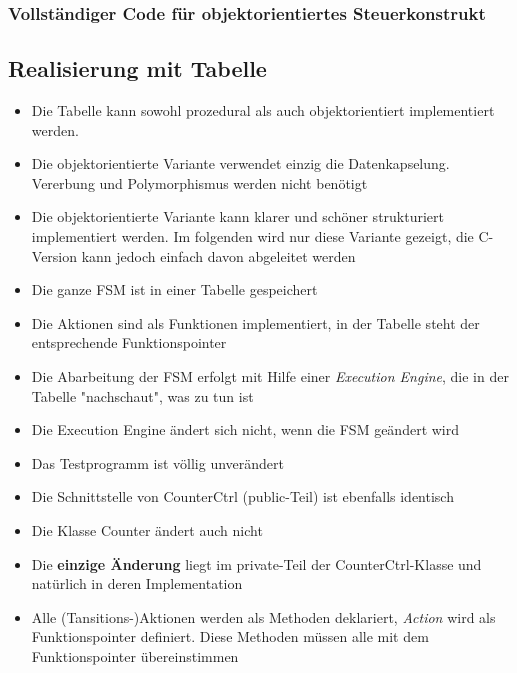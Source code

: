 \subsubsection{Vollständiger Code für objektorientiertes Steuerkonstrukt}



\subsection{Realisierung mit Tabelle}
\begin{itemize}
      \item Die Tabelle kann sowohl prozedural als auch objektorientiert implementiert werden.
      \item Die objektorientierte Variante verwendet einzig die Datenkapselung. Vererbung und Polymorphismus werden nicht benötigt
      \item Die objektorientierte Variante kann klarer und schöner strukturiert implementiert werden. Im folgenden wird nur diese Variante gezeigt, die C-Version kann jedoch einfach davon abgeleitet werden
      \item Die ganze FSM ist in einer Tabelle gespeichert
      \item Die Aktionen sind als Funktionen implementiert, in der Tabelle steht der entsprechende Funktionspointer
      \item Die Abarbeitung der FSM erfolgt mit Hilfe einer \textit{Execution Engine}, die in der Tabelle "nachschaut", was zu tun ist
      \item Die Execution Engine ändert sich nicht, wenn die FSM geändert wird
      \item Das Testprogramm ist völlig unverändert
      \item Die Schnittstelle von CounterCtrl (public-Teil) ist ebenfalls identisch
      \item Die Klasse Counter ändert auch nicht
      \item Die \textbf{einzige Änderung} liegt im private-Teil der
            CounterCtrl-Klasse und natürlich in deren Implementation
      \item Alle (Tansitions-)Aktionen werden als Methoden deklariert,
            \textit{Action} wird als Funktionspointer definiert. Diese Methoden müssen
            alle mit dem Funktionspointer übereinstimmen
            


\end{itemize}
